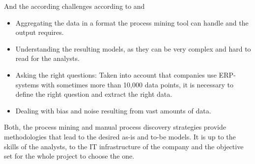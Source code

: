 And the according challenges according to \cite{manifesto2011} and \cite{Dumas2013}
\begin{itemize}
\item Aggregating the data in a format the process mining tool can handle and the output requires. 
\item Understanding the resulting models, as they can be very complex and hard to read for the analysts.
\item Asking the right questions: Taken into account that companies use ERP-systems with sometimes more than 10,000 data points, it is necessary to define the right question and extract the right data. 
\item Dealing with bias and noise resulting from vast amounts of data. 
\end{itemize}

Both, the process mining and manual process discovery strategies provide methodologies that lead to the desired as-is and to-be models. It is up to the skills of the analysts, to the IT infrastructure of the company and the objective set for the whole project to choose the one. 

